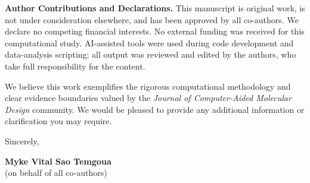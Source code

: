 \documentclass[11pt,letterpaper]{article}
\begin{document}
\vspace{0.3em}

\noindent\textbf{Author Contributions and Declarations.}
This manuscript is original work, is not under consideration elsewhere, and has been approved by all co-authors. We declare no competing financial interests. No external funding was received for this computational study. AI-assisted tools were used during code development and data-analysis scripting; all output was reviewed and edited by the authors, who take full responsibility for the content.

We believe this work exemplifies the rigorous computational methodology and clear evidence boundaries valued by the \textit{Journal of Computer-Aided Molecular Design} community. We would be pleased to provide any additional information or clarification you may require.

\vspace{0.5em}

\noindent Sincerely,

\vspace{0.5em}

\noindent \textbf{Myke Vital Sao Temgoua} \\
\noindent (on behalf of all co-authors)
\end{document}
